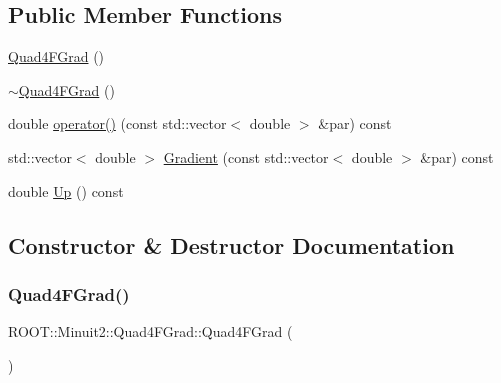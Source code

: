 \subsection*{Public Member Functions}
\begin{DoxyCompactItemize}
\item 
\mbox{\hyperlink{classROOT_1_1Minuit2_1_1Quad4FGrad_a2776a889d4aa5c04bff2433bac520557}{Quad4\+F\+Grad}} ()
\item 
\mbox{\hyperlink{classROOT_1_1Minuit2_1_1Quad4FGrad_a9b87859d52b24a21c72491faba7fb6a5}{$\sim$\+Quad4\+F\+Grad}} ()
\item 
double \mbox{\hyperlink{classROOT_1_1Minuit2_1_1Quad4FGrad_a8aaafaa9d7f974e27f5b54b30289dd6d}{operator()}} (const std\+::vector$<$ double $>$ \&par) const
\item 
std\+::vector$<$ double $>$ \mbox{\hyperlink{classROOT_1_1Minuit2_1_1Quad4FGrad_afd3b64a4236e31bdf9c330e33ac7ac89}{Gradient}} (const std\+::vector$<$ double $>$ \&par) const
\item 
double \mbox{\hyperlink{classROOT_1_1Minuit2_1_1Quad4FGrad_a0c477f97bac7a89bea6bdea9fdae92cf}{Up}} () const
\end{DoxyCompactItemize}


\subsection{Constructor \& Destructor Documentation}
\mbox{\label{classROOT_1_1Minuit2_1_1Quad4FGrad_a2776a889d4aa5c04bff2433bac520557}} 
\subsubsection{\texorpdfstring{Quad4FGrad()}{Quad4FGrad()}}
{\footnotesize\ttfamily R\+O\+O\+T\+::\+Minuit2\+::\+Quad4\+F\+Grad\+::\+Quad4\+F\+Grad (\begin{DoxyParamCaption}{ }\end{DoxyParamCaption})\hspace{0.3cm}{\ttfamily [inline]}}

\mbox{\label{classROOT_1_1Minuit2_1_1Quad4FGrad_a9b87859d52b24a21c72491faba7fb6a5}} 
